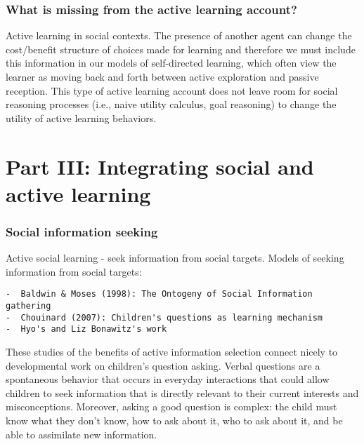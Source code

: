 \documentclass[a4paper,man,apacite,floatsintext]{apa6}
\begin{document}
\subsubsection{What is missing from the active learning
account?}\label{what-is-missing-from-the-active-learning-account}

Active learning in social contexts. The presence of another agent can
change the cost/benefit structure of choices made for learning and
therefore we must include this information in our models of
self-directed learning, which often view the learner as moving back and
forth between active exploration and passive reception. This type of
active learning account does not leave room for social reasoning
processes (i.e., naive utility calculus, goal reasoning) to change the
utility of active learning behaviors.

\section{Part III: Integrating social and active
learning}\label{part-iii-integrating-social-and-active-learning}

\subsubsection{Social information
seeking}\label{social-information-seeking}

Active social learning - seek information from social targets. Models of
seeking information from social targets:

\begin{verbatim}
-  Baldwin & Moses (1998): The Ontogeny of Social Information gathering
-  Chouinard (2007): Children's questions as learning mechanism
-  Hyo's and Liz Bonawitz's work
\end{verbatim}

These studies of the benefits of active information selection connect
nicely to developmental work on children's question asking. Verbal
questions are a spontaneous behavior that occurs in everyday
interactions that could allow children to seek information that is
directly relevant to their current interests and misconceptions.
Moreover, asking a good question is complex: the child must know what
they don't know, how to ask about it, who to ask about it, and be able
to assimilate new information.
\end{document}
